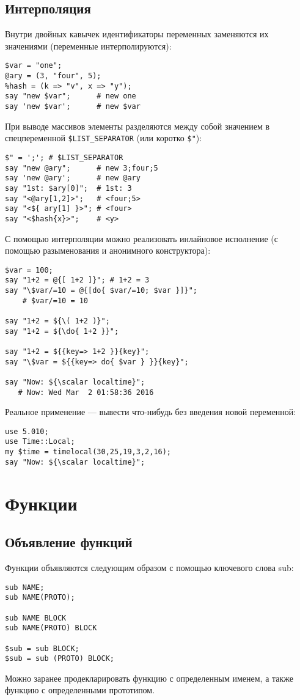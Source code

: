 \subsection{Интерполяция} %
Внутри двойных кавычек идентификаторы переменных заменяются их значениями (переменные интерполируются):
\begin{verbatim}
$var = "one";
@ary = (3, "four", 5);
%hash = (k => "v", x => "y");
say "new $var";      # new one
say 'new $var';      # new $var
\end{verbatim}
При выводе массивов элементы разделяются между собой значением в спецпеременной \verb|$LIST_SEPARATOR| (или коротко \verb|$"|):
\begin{verbatim}
$" = ';'; # $LIST_SEPARATOR
say "new @ary";      # new 3;four;5
say 'new @ary';      # new @ary
say "1st: $ary[0]";  # 1st: 3
say "<@ary[1,2]>";   # <four;5>
say "<${ ary[1] }>"; # <four>
say "<$hash{x}>";    # <y>
\end{verbatim}
С помощью интерполяции можно реализовать инлайновое исполнение (с помощью разыменования и анонимного конструктора):
\begin{verbatim}
$var = 100;
say "1+2 = @{[ 1+2 ]}"; # 1+2 = 3
say "\$var/=10 = @{[do{ $var/=10; $var }]}";
    # $var/=10 = 10

say "1+2 = ${\( 1+2 )}";
say "1+2 = ${\do{ 1+2 }}";

say "1+2 = ${{key=> 1+2 }}{key}";
say "\$var = ${{key=> do{ $var } }}{key}";

say "Now: ${\scalar localtime}";
   # Now: Wed Mar  2 01:58:36 2016
\end{verbatim}
Реальное применение --- вывести что-нибудь без введения новой переменной:
\begin{verbatim}
use 5.010;
use Time::Local;
my $time = timelocal(30,25,19,3,2,16);
say "Now: ${\scalar localtime}";
\end{verbatim}

\section{Функции} %
\subsection{Объявление функций}
Функции объявляются следующим образом с помощью ключевого слова sub:
\begin{verbatim}
sub NAME;
sub NAME(PROTO);

sub NAME BLOCK
sub NAME(PROTO) BLOCK

$sub = sub BLOCK;
$sub = sub (PROTO) BLOCK;
\end{verbatim}
Можно заранее продекларировать функцию с определенным именем, а также функцию с определенными прототипом.

